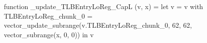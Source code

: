 function _update_TLBEntryLoReg_CapL (v, x) = let v = { v with TLBEntryLoReg_chunk_0 = vector_update_subrange(v.TLBEntryLoReg_chunk_0, 62, 62, vector_subrange(x, 0, 0)) } in v
